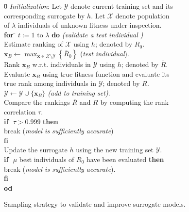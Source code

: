 \documentclass[10pt, conference]{IEEEtran} %
\renewcommand{\vec}[1]{\mathbf{#1}}
\begin{document}
\begin{figure}[t!]
\centering \noindent 
{\footnotesize
\begin{tabbing}
\quad \quad \= 0\;\; \= \emph{Initialization}: Let $\mathcal{Y}$ denote current training set and its \\
\>   \> corresponding surrogate by $h$. Let $\mathcal{X}$ denote population \\
\>   \> of $\lambda$ individuals of unknown fitness under inspection.\\
  \> {\bf for} \= $t := 1$ to $\lambda$ {\bf do} \emph{(validate a test individual )}\\ 
  \>\> Estimate ranking of $\mathcal{X}$ using $h$; denoted by $\bar{R}_0$. \\
  \>\> $\vec{x}_B \leftarrow \max_{\vec{x}\in\mathcal{X}\setminus\mathcal{Y}}\left\{\bar{R}_0\right\}$ (\emph{test individual}). \\
  \>\> Rank $\vec{x}_B$ w.r.t. individuals  in $\mathcal{Y}$ using $h$; denoted by $\bar{R}$. \\
  \>\> Evaluate $\vec{x}_B$ using true fitness function and evaluate its\\
\>   \>\> true rank among individuals  in $\mathcal{Y}$; denoted by $R$. \\ 
  \>\> $\mathcal{Y}\leftarrow\mathcal{Y}\cup\{\vec{x}_B\}$ \emph{(add to training set)}. \\
  \>\> Compare the rankings  $\bar{R}$ and $R$ by computing the rank \\
\>   \>\> correlation $\tau$.\\
  \>\> {\bf if} \= $\tau>0.999$ {\bf then} \\
  \>\> \> break (\emph{model is sufficiently accurate}) \\
 \>\> {\bf fi} \\
  \>\> Update the surrogate $h$ using the new training set $\mathcal{Y}$.\\
  \>\> {\bf if} \= $\mu$ best individuals of $\bar{R}_0$ have been evaluated {\bf then} \\
  \>\> \> break (\emph{model is sufficiently accurate}). \\
  \>\> {\bf fi} \\
  \> {\bf od}\\
\end{tabbing}}
\caption{Sampling strategy to validate and improve surrogate models.}\label{fig:improvedmodel}
\end{figure}
\end{document}
